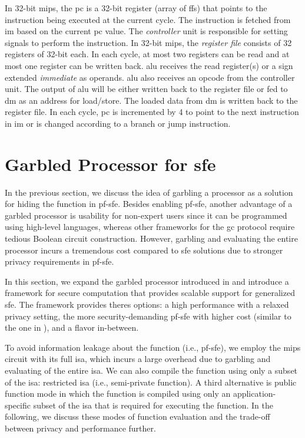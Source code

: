 In 32-bit \gls{mips}, the \acrfull{pc} is a 32-bit register (array of \acrshort{ff}s) that points to the instruction being executed at the current cycle.
The instruction is fetched from \acrshort{im} based on the current \acrshort{pc} value.
The \emph{controller} unit is responsible for setting signals to perform the instruction.
In 32-bit \gls{mips}, the \emph{register file} consists of 32 registers of 32-bit each.
In each cycle, at most two registers can be read and at most one register can be written back.
\acrshort{alu} receives the read register(s) or a sign extended \emph{immediate} as operands.
\acrshort{alu} also receives an opcode from the controller unit.
The output of \acrshort{alu} will be either written back to the register file or fed to \acrshort{dm} as an address for load/store.
The loaded data from \acrshort{dm} is written back to the register file.
In each cycle, \acrshort{pc} is incremented by 4 to point to the next instruction in \acrshort{im} or is changed according to a branch or jump instruction.

\section{Garbled Processor for \acrshort{sfe}}\label{sec:processor-mips-sfe}
In the previous section, we discuss the idea of garbling a processor as a solution for hiding the function in \acrshort{pf-sfe}.
Besides enabling \acrshort{pf-sfe}, another advantage of a garbled processor is usability for non-expert users since it can be programmed using high-level languages, whereas other frameworks for the \acrshort{gc} protocol require tedious Boolean circuit construction.
However, garbling and evaluating the entire processor incurs a tremendous cost compared to \acrshort{sfe} solutions due to stronger privacy requirements in \acrshort{pf-sfe}.

In this section, we expand the garbled processor introduced in  and introduce a framework for secure computation that provides scalable support for generalized \acrshort{sfe}.
The framework provides theres options: a high performance with a relaxed privacy setting, the more security-demanding \acrshort{pf-sfe} with higher cost (similar to the one in ), and a flavor in-between.

To avoid information leakage about the function (i.e., \acrshort{pf-sfe}), we employ the \gls{mips} circuit with its full \acrfull{isa}, which incurs a large overhead due to garbling and evaluating of the entire \acrshort{isa}.
We can also compile the function using only a subset of the \acrshort{isa}: restricted \acrshort{isa} (i.e., semi-private function).
A third alternative is public function mode in which the function is compiled using only an application-specific subset of the \acrshort{isa} that is required for executing the function.
In the following, we discuss these modes of function evaluation and the trade-off between privacy and performance further.

